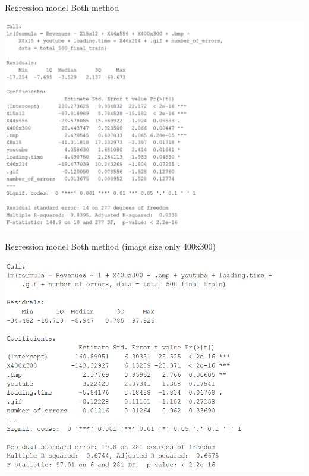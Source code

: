 \documentclass{book}
\begin{document}
\begin{table}[H]
\centering
\caption{Regression model Both method}\label{d :r :a}
\begin{center}
\includegraphics[scale=0.8]{../R/photos/81_modela.PNG}   \\
\end{center}
\end{table}


\begin{table}[H]
\centering
\caption{Regression model Both method (image size only 400x300)}\label{d :r :5}
\begin{center}
\includegraphics[scale=0.8]{../R/photos/87_full5.PNG}  \\
\end{center}
\end{table}
\end{document}
